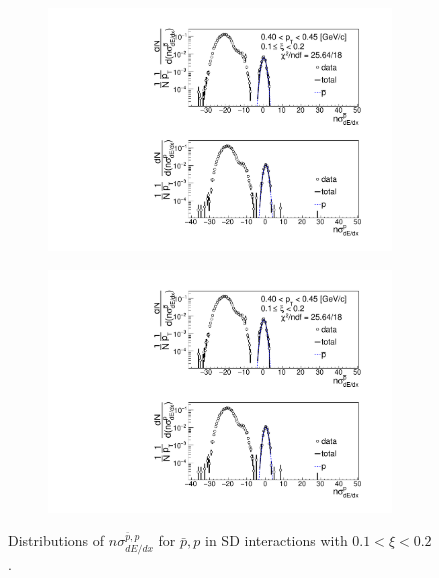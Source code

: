 \begin{figure}[h!]
\begin{subfigure}{.32\textwidth}
		\includegraphics[width=\linewidth, page=11]{chapters/chrgSTAR/img/dEdx/fit2019_thirdStep_2_2.pdf}
	\end{subfigure}
	\begin{subfigure}{.32\textwidth}
		\includegraphics[width=\linewidth, page=12]{chapters/chrgSTAR/img/dEdx/fit2019_thirdStep_2_2.pdf}
	\end{subfigure}
	\caption[Distributions of $n\sigma^{\bar{p},p}_{dE/dx}$ for $\bar{p},p$ in SD interactions with $0.1 < \xi<0.2$]{Distributions of $n\sigma^{\bar{p},p}_{dE/dx}$ for $\bar{p},p$ in SD interactions with $0.1 < \xi<0.2$.}
	\label{fig:nsigmapfit_2}
\end{figure}